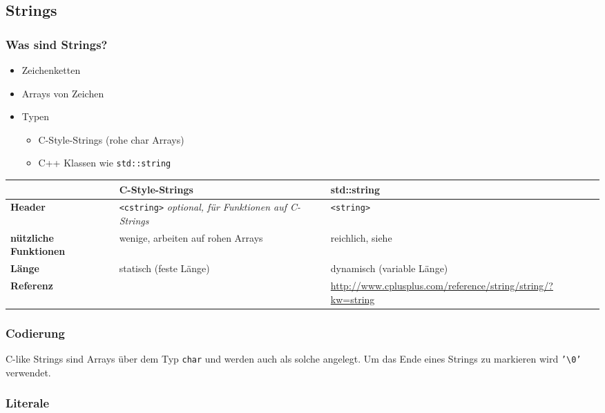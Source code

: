 \documentclass[a4paper]{report}
\begin{document}
\subsection{Strings}

\subsubsection{Was sind Strings?}
\begin{itemize}
	\item Zeichenketten
	\item Arrays von Zeichen
	\item Typen
	\begin{itemize}
		\item C-Style-Strings (rohe char Arrays)
		\item C++ Klassen wie \texttt{std::string}
	\end{itemize}
\end{itemize}

\begin{center}
	\begin{tabular}{|M{3cm}|M{6cm}|M{6cm}|} \hline
		&\textbf{C-Style-Strings} & \textbf{std::string} \\ \hline
		\textbf{Header} & \texttt{<cstring>} \textit{optional, für Funktionen auf C-Strings} & \texttt{<string>} \\ \hline
		\textbf{nützliche Funktionen} & wenige, arbeiten auf rohen Arrays & reichlich, siehe \\ \hline
		\textbf{Länge} & statisch (feste Länge) & dynamisch (variable Länge)\\ \hline
		\textbf{Referenz} & & \url{http://www.cplusplus.com/reference/string/string/?kw=string} \\ \hline
	\end{tabular}
\end{center}

\subsubsection{Codierung}
C-like Strings sind Arrays über dem Typ \texttt{char} und werden auch als solche angelegt. Um das Ende eines Strings zu markieren wird \texttt{'\textbackslash 0'} verwendet.

\subsubsection{Literale}
\end{document}
